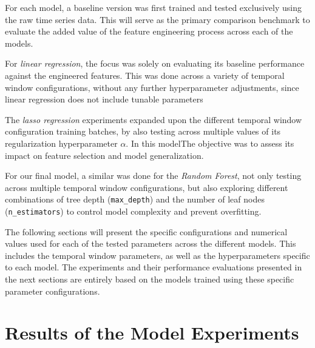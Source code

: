 \documentclass[12pt]{report} %
\begin{document}
For each model, a baseline version was first trained and tested exclusively using the raw time series data. This will serve as the primary comparison benchmark to evaluate the added value of the feature engineering process across each of the models.

For \textit{linear regression}, the focus was solely on evaluating its baseline performance against the engineered features. This was done across a variety of temporal window configurations, without any further hyperparameter adjustments, since linear regression does not include tunable parameters

The \textit{lasso regression} experiments expanded upon the different temporal window configuration training batches, by also testing across multiple values of its regularization hyperparameter $\alpha$. In this modelThe objective was to assess its impact on feature selection and model generalization.

For our final model, a similar was done for the \textit{Random Forest}, not only testing across multiple temporal window configurations, but also exploring different combinations of tree depth (\verb|max_depth|) and the number of leaf nodes (\verb|n_estimators|) to control model complexity and prevent overfitting.

The following sections will present the specific configurations and numerical values used for each of the tested parameters across the different models. This includes the temporal window parameters, as well as the hyperparameters specific to each model. The experiments and their performance evaluations presented in the next sections are entirely based on the models trained using these specific parameter configurations.


\section{Results of the Model Experiments}


\end{document}
